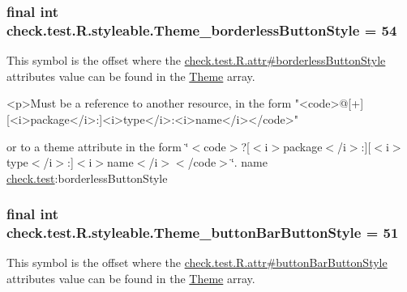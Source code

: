 \subsubsection[{Theme\+\_\+borderless\+Button\+Style}]{\setlength{\rightskip}{0pt plus 5cm}final int check.\+test.\+R.\+styleable.\+Theme\+\_\+borderless\+Button\+Style = 54\hspace{0.3cm}{\ttfamily [static]}}\label{classcheck_1_1test_1_1_r_1_1styleable_a12279ad7c3b04030bd65962776fcef88}
This symbol is the offset where the \hyperlink{classcheck_1_1test_1_1_r_1_1attr_ab91a7f4468af245ddb54818cf62a7032}{check.\+test.\+R.\+attr\#borderless\+Button\+Style} attribute\textquotesingle{}s value can be found in the \hyperlink{classcheck_1_1test_1_1_r_1_1styleable_acca726d02016a0cf607782ec3a436a81}{Theme} array.

\begin{DoxyVerb}      <p>Must be a reference to another resource, in the form "<code>@[+][<i>package</i>:]<i>type</i>:<i>name</i></code>"
\end{DoxyVerb}
 or to a theme attribute in the form \char`\"{}$<$code$>$?\mbox{[}$<$i$>$package$<$/i$>$\+:\mbox{]}\mbox{[}$<$i$>$type$<$/i$>$\+:\mbox{]}$<$i$>$name$<$/i$>$$<$/code$>$\char`\"{}.  name \hyperlink{namespacecheck_1_1test}{check.\+test}\+:borderless\+Button\+Style \hypertarget{classcheck_1_1test_1_1_r_1_1styleable_afeba9266742fb85f098bb860e221c453}{}
\subsubsection[{Theme\+\_\+button\+Bar\+Button\+Style}]{\setlength{\rightskip}{0pt plus 5cm}final int check.\+test.\+R.\+styleable.\+Theme\+\_\+button\+Bar\+Button\+Style = 51\hspace{0.3cm}{\ttfamily [static]}}\label{classcheck_1_1test_1_1_r_1_1styleable_afeba9266742fb85f098bb860e221c453}
This symbol is the offset where the \hyperlink{classcheck_1_1test_1_1_r_1_1attr_a109ef78c6f65afeee8c7cc0206f19777}{check.\+test.\+R.\+attr\#button\+Bar\+Button\+Style} attribute\textquotesingle{}s value can be found in the \hyperlink{classcheck_1_1test_1_1_r_1_1styleable_acca726d02016a0cf607782ec3a436a81}{Theme} array.

